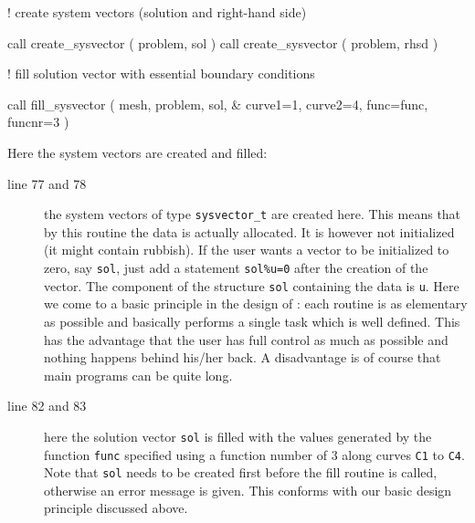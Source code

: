 \begin{listingcont}
! create system vectors (solution and right-hand side)
                                                                                
  call create_sysvector ( problem, sol )
  call create_sysvector ( problem, rhsd )
                                                                                
! fill solution vector with essential boundary conditions
                                                                                
  call fill_sysvector ( mesh, problem, sol, &
    curve1=1, curve2=4, func=func, funcnr=3 )

\end{listingcont}
Here the system vectors are created and filled:
\begin{description}
   \item[line 77 and 78] the system vectors of type \texttt{sysvector\_t} are
created here. This means that by this routine the data is actually allocated.
It is however not initialized (it might contain rubbish). If the user wants a
vector to be initialized to zero, say \texttt{sol}, just add a statement
\texttt{sol\%u=0} after the creation of the vector. The component of the
structure \texttt{sol} containing the data is \texttt{u}.
Here we come to a basic
principle in the design of \tfem: each routine is as elementary as possible and
basically performs a single task which is well defined. This has the advantage
that the user has full control as much as possible and nothing happens behind
his/her back. A disadvantage is of course that main programs can be quite long.
   \item[line 82 and 83] here the solution vector \texttt{sol} is filled with
  the values generated by the function \texttt{func}
  specified using a function number of 3 
 along curves \texttt{C1} to \texttt{C4}. Note that \texttt{sol} needs to be
created first before the fill routine is called, otherwise an error message is
given. This conforms with our basic design principle discussed above.
\end{description}

